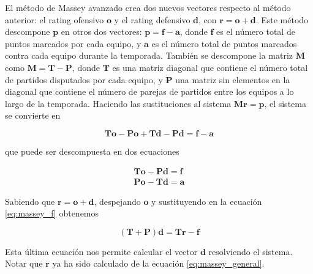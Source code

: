 El método de Massey avanzado crea dos nuevos vectores respecto al método anterior: el rating ofensivo $\mathbf{o}$ y el rating defensivo $\mathbf{d}$, con $\mathbf{r} = \mathbf{o} + \mathbf{d}$. Este método descompone $\mathbf{p}$ en otros dos vectores: $ \mathbf{p} = \mathbf{f} - \mathbf{a}$, donde $\mathbf{f}$ es el número total de puntos marcados por cada equipo, y $\mathbf{a}$ es el número total de puntos marcados contra cada equipo durante la temporada. También se descompone la matriz $\mathbf{M}$ como $\mathbf{M} = \mathbf{T} - \mathbf{P}$, donde $\mathbf{T}$ es una matriz diagonal que contiene el número total de partidos disputados por cada equipo, y $\mathbf{P}$ una matriz sin elementos en la diagonal que contiene el número de parejas de partidos entre los equipos a lo largo de la temporada. Haciendo las sustituciones al sistema $\mathbf{M r } = \mathbf{p}$, el sistema se convierte en

\begin{equation}
\mathbf{T o} - \mathbf{P o} + \mathbf{T d} - \mathbf{P d} = \mathbf{f} - \mathbf{a}
\end{equation}

que puede ser descompuesta en dos ecuaciones

\begin{eqnarray}
\mathbf{T o} - \mathbf{P d} = \mathbf{f}\\ \label{eq:massey_f}
\mathbf{P o} - \mathbf{T d} = \mathbf{a} \label{eq:massey}
\end{eqnarray} 

Sabiendo que $\mathbf{r} = \mathbf{o} + \mathbf{d}$, despejando $\mathbf{o}$ y sustituyendo en la ecuación \ref{eq:massey_f} obtenemos

\begin{equation}
(\mathbf{T} + \mathbf{P})\mathbf{d} = \mathbf{T r} - \mathbf{f} \label{eq:massey_d}
\end{equation}

Esta última ecuación nos permite calcular el vector $\mathbf{d}$ resolviendo el sistema. Notar que $\mathbf{r}$ ya ha sido calculado de la ecuación \ref{eq:massey_general}.


